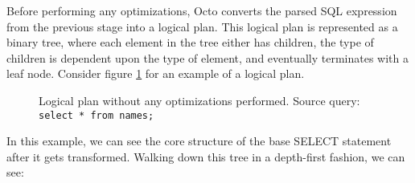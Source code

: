 \documentclass[]{article}
\begin{document}
Before performing any optimizations, Octo converts the parsed SQL expression from the previous stage into a logical plan.
This logical plan is represented as a binary tree, where each element in the tree either has children, the type of children is dependent upon the type of element, and eventually terminates with a leaf node.
Consider figure \ref{fig:lp_before_optimizations} for an example of a logical plan.

\begin{figure}
	
	\caption{Logical plan without any optimizations performed. Source query: \texttt{select * from names;}}
	\label{fig:lp_before_optimizations}
\end{figure}

In this example, we can see the core structure of the base SELECT statement after it gets transformed.
Walking down this tree in a depth-first fashion, we can see:
\end{document}

